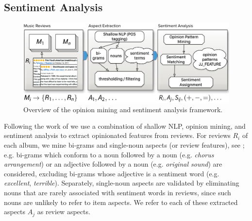 \subsection{Sentiment Analysis}\label{sec:sentiment}
\begin{figure}
\includegraphics[width=\columnwidth]{ch07_text-class/pics/omf}
\caption{Overview of the opinion mining and sentiment analysis framework.}
\label{fig:OMF}
\end{figure}
Following the work of \cite{DongSOS13,DongOS14} we use a combination of shallow NLP, opinion mining, and sentiment analysis to extract opinionated features from reviews. For reviews $R_{i}$ of each album, we mine bi-grams and single-noun aspects (or review features), see \cite{Hu2004}; e.g. bi-grams which conform to a noun followed by a noun (e.g. \emph{chorus arrangement}) or an adjective followed by a noun (e.g. \emph{original sound}) are considered, excluding bi-grams whose adjective is a sentiment word (e.g. \emph{excellent}, \emph{terrible}). Separately, single-noun aspects are validated by eliminating nouns that are rarely associated with sentiment words in reviews, since such nouns are unlikely to refer to item aspects. We refer to each of these extracted aspects $A_{j}$ as review aspects.

